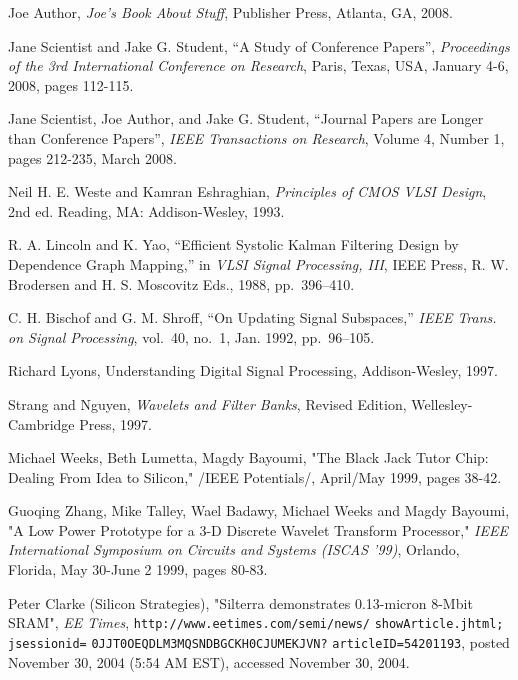 \documentclass[final]{ieee}
\begin{document}
\begin{thebibliography}{99}

   Joe Author, {\it Joe's Book About Stuff}, Publisher Press,
  Atlanta, GA, 2008.
  
   Jane Scientist and Jake G. Student, 
   ``A Study of Conference Papers'', {\it Proceedings of the 3rd International
    Conference on Research}, Paris, Texas, USA, January 4-6, 2008, pages 112-115.
    
     Jane Scientist, Joe Author, and Jake G. Student,
    ``Journal Papers are Longer than Conference Papers'', 
    {\it IEEE Transactions on Research}, Volume 4, Number 1, pages 212-235,
    March 2008.
  
  
   Neil H. E. Weste and Kamran Eshraghian, {\it Principles
  of CMOS VLSI Design}, 2nd ed. Reading, MA: Addison-Wesley, 1993.

   R. A. Lincoln and K. Yao, ``Efficient Systolic Kalman
  Filtering Design by Dependence Graph Mapping,'' in {\it VLSI Signal
  Processing, III}, IEEE Press, R. W. Brodersen and H. S. Moscovitz Eds.,
  1988, pp.~396--410.

   C. H. Bischof and G. M. Shroff, ``On Updating Signal
  Subspaces,'' {\it IEEE Trans. on Signal Processing}, vol.~40, no.~1,
   Jan. 1992, pp.~96--105.

   Richard Lyons, {Understanding Digital Signal Processing},
Addison-Wesley, 1997.

   Strang and Nguyen, {\it Wavelets and Filter Banks}, Revised
Edition, Wellesley-Cambridge Press, 1997.

 Michael Weeks, Beth Lumetta, Magdy Bayoumi, "The Black Jack
Tutor Chip: Dealing From Idea to Silicon," /IEEE Potentials/, April/May
1999, pages 38-42.

 Guoqing Zhang, Mike Talley, Wael Badawy, Michael Weeks and
Magdy Bayoumi, "A Low Power Prototype for a 3-D Discrete Wavelet
Transform Processor," {\it IEEE International Symposium on Circuits and
Systems (ISCAS '99)}, Orlando, Florida, May 30-June 2 1999, pages 80-83.

 Peter Clarke (Silicon Strategies), "Silterra demonstrates
0.13-micron 8-Mbit SRAM", {\it EE Times},
\texttt{http://www.eetimes.com/semi/news/}
\texttt{showArticle.jhtml;}
\texttt{jsessionid=}
\texttt{0JJT0OEQDLM3MQSNDBGCKH0CJUMEKJVN?}
\texttt{articleID=54201193},
posted November 30, 2004 (5:54 AM EST), accessed November 30, 2004.



\end{thebibliography}
\end{document}
